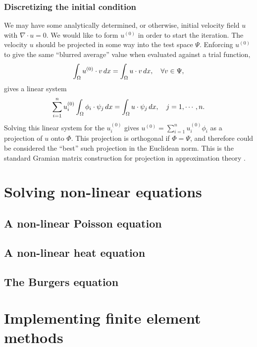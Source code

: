 \subsubsection{Discretizing the initial condition}
We may have some analytically determined, or otherwise, initial velocity field $u$ with $\nabla\cdot u = 0$.
We would like to form $u^{(0)}$ in order to start the iteration. The velocity $u$ should be projected in some way into the test space $\Psi$.
Enforcing $u^{(0)}$ to give the same ``blurred average'' value when evaluated against a trial function,
\begin{equation}\label{initial_velocity_projection}
    \int_{\Omega} u^{(0)}\cdot v\,dx = \int_{\Omega} u \cdot v\,dx,\quad \forall v \in \Psi,
\end{equation}
gives a linear system
\begin{equation}\label{initial_velocity_projection_linear_system}
    \sum_{i=1}^n u^{(0)}_i \int_{\Omega} \phi_i \cdot \psi_j\,dx = \int_{\Omega} u\cdot \psi_j\,dx,
    \quad j=1,\cdots,n.
\end{equation}
Solving this linear system for the $u^{(0)}_i$ gives $u^{(0)} = \sum_{i=1}^n u^{(0)}_i \phi_i$ as a projection of $u$ onto $\Phi$.
This projection is orthogonal if $\Phi = \Psi$, and therefore could be considered the ``best'' such projection in the Euclidean norm.
This is the standard Gramian matrix construction for projection in approximation theory \cite{approximation_theory}.


\section{Solving non-linear equations}
\subsection{A non-linear Poisson equation}
\subsection{A non-linear heat equation}
\subsection{The Burgers equation}

\section{Implementing finite element methods}

